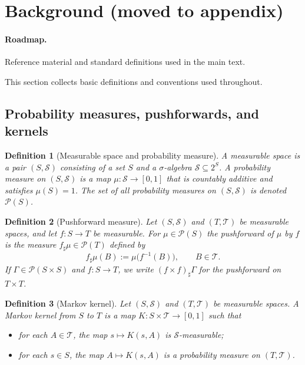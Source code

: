 \documentclass[11pt]{article}
\newtheorem{definition}{Definition}
\begin{document}
\section{Background (moved to appendix)}
\label{app:background}


\paragraph{Roadmap.}
Reference material and standard definitions used in the main text.
\medskip
\label{sec:background}

This section collects basic definitions and conventions used throughout.

\subsection{Probability measures, pushforwards, and kernels}

\begin{definition}[Measurable space and probability measure]
A \emph{measurable space} is a pair $(S,\mathcal{S})$ consisting of a set
$S$ and a $\sigma$-algebra $\mathcal{S}\subseteq 2^S$. A
\emph{probability measure} on $(S,\mathcal{S})$ is a map
$\mu:\mathcal{S}\to[0,1]$ that is countably additive and satisfies
$\mu(S)=1$. The set of all probability measures on $(S,\mathcal{S})$ is
denoted $\mathcal{P}(S)$.
\end{definition}

\begin{definition}[Pushforward measure]
Let $(S,\mathcal{S})$ and $(T,\mathcal{T})$ be measurable spaces, and let
$f:S\to T$ be measurable. For $\mu\in\mathcal{P}(S)$ the
\emph{pushforward} of $\mu$ by $f$ is the measure
$f_{\sharp}\mu\in\mathcal{P}(T)$ defined by
\[
  f_{\sharp}\mu(B) := \mu\bigl(f^{-1}(B)\bigr),
  \qquad B\in\mathcal{T}.
\]
If $\Gamma\in\mathcal{P}(S\times S)$ and $f:S\to T$, we write
$(f\times f)_{\sharp}\Gamma$ for the pushforward on $T\times T$.
\end{definition}

\begin{definition}[Markov kernel]
Let $(S,\mathcal{S})$ and $(T,\mathcal{T})$ be measurable spaces. A
\emph{Markov kernel} from $S$ to $T$ is a map
$K:S\times\mathcal{T}\to[0,1]$ such that
\begin{itemize}[leftmargin=1.5em]
  \item for each $A\in\mathcal{T}$, the map $s\mapsto K(s,A)$ is
  $\mathcal{S}$-measurable;
  \item for each $s\in S$, the map $A\mapsto K(s,A)$ is a probability
  measure on $(T,\mathcal{T})$.
\end{itemize}
\end{definition}
\end{document}
